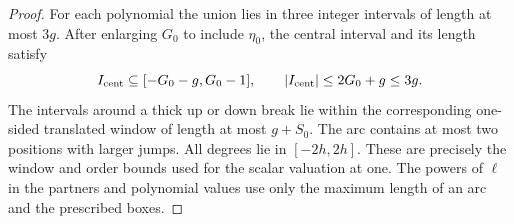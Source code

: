 \begin{proof}
For each polynomial the union lies in three integer intervals
of length at most \(3g\). After enlarging \(G_0\) to include \(\eta_0\), the central interval and its length satisfy
\[
 I_{\rm cent}\subseteq[-G_0-g,G_0-1],\qquad |I_{\rm cent}|\le2G_0+g\le3g.
\]
The intervals around a
thick up or down break lie within the corresponding one-sided
translated window of length at most \(g+S_0\).
The arc contains at most two positions with larger jumps. All degrees lie
in \([-2h,2h]\). These are precisely the window and order
bounds used for the scalar valuation at one. The powers of
\(\ell\) in the partners and polynomial values use only the
maximum length of an arc and the prescribed boxes.
\end{proof}
